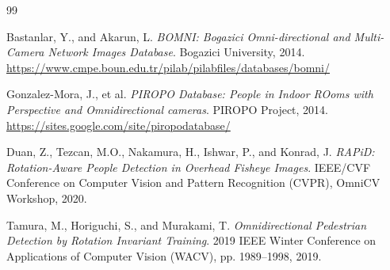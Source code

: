 \documentclass[11pt]{article}
\begin{document}
\begin{thebibliography}{99}

Bastanlar, Y., and Akarun, L.
\textit{BOMNI: Bogazici Omni-directional and Multi-Camera Network Images Database}.
Bogazici University, 2014.
\url{https://www.cmpe.boun.edu.tr/pilab/pilabfiles/databases/bomni/}

Gonzalez-Mora, J., et al.
\textit{PIROPO Database: People in Indoor ROoms with Perspective and Omnidirectional cameras}.
PIROPO Project, 2014.
\url{https://sites.google.com/site/piropodatabase/}

Duan, Z., Tezcan, M.O., Nakamura, H., Ishwar, P., and Konrad, J.
\textit{RAPiD: Rotation-Aware People Detection in Overhead Fisheye Images}.
IEEE/CVF Conference on Computer Vision and Pattern Recognition (CVPR), OmniCV Workshop, 2020.

Tamura, M., Horiguchi, S., and Murakami, T.
\textit{Omnidirectional Pedestrian Detection by Rotation Invariant Training}.
2019 IEEE Winter Conference on Applications of Computer Vision (WACV), pp. 1989--1998, 2019.

\end{thebibliography}
\end{document}
